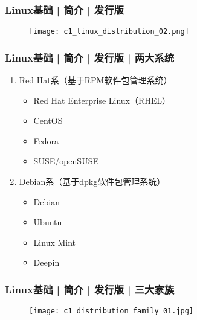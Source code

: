 \begin{frame}
  \frametitle{Linux基础 | 简介 | 发行版}
  \begin{figure}
    \centering
    \texttt{[image: c1\_linux\_distribution\_02.png]}
  \end{figure}
\end{frame}

\begin{frame}
  \frametitle{Linux基础 | 简介 | 发行版 | \alert{两大系统}}
  \begin{enumerate}
    \item Red Hat系（基于RPM软件包管理系统）
      \begin{itemize}
        \item Red Hat Enterprise Linux（RHEL）
        \item CentOS
        \item Fedora
        \item SUSE/openSUSE
      \end{itemize}
    \item Debian系（基于dpkg软件包管理系统）
      \begin{itemize}
        \item Debian
        \item Ubuntu
        \item Linux Mint
        \item Deepin
      \end{itemize}
  \end{enumerate}
\end{frame}

\begin{frame}
  \frametitle{Linux基础 | 简介 | 发行版 | \alert{三大家族}}
  \begin{figure}
    \centering
    \texttt{[image: c1\_distribution\_family\_01.jpg]}
  \end{figure}
\end{frame}

